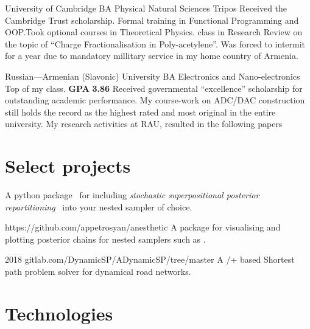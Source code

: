\documentclass{CurriculumVitae}[10pt, condensed]
\begin{document}
{    {University of Cambridge} {BA
     }{Physical Natural Sciences Tripos} {Received the
     Cambridge Trust scholarship. Formal training in Functional
     Programming and OOP.\@ Took optional courses in Theoretical
     Physics.  class in Research Review on the topic of
     ``Charge Fractionalisation in Poly-acetylene''. Was forced to
     intermit for a year due to mandatory millitary service in my home
     country of Armenia. }

    {Russian---Armenian (Slavonic) University}
   {BA }{Electronics and Nano-electronics} {Top of my
     class. \textbf{GPA} \textbf{3.86} Received governmental
     ``excellence'' scholarship for outstanding academic
     performance. My course-work on ADC/DAC construction still holds
     the record as the highest rated and most original in the entire
     university. My research activities at RAU, resulted in
     the following papers~\cite{cu2o,measurement}}

   \section*{Select projects}%
%


 {A
  python package~\cite{sspr-joss} for including \emph{stochastic
    superpositional posterior repartitioning}~\cite{sspr} into your
  nested sampler of choice.}

 {https://github.com/appetrosyan/anesthetic}
{A package for visualising and plotting posterior chains for nested
  samplers such as .}


 {2018}
{gitlab.com/DynamicSP/ADynamicSP/tree/master} {A
  /+ based Shortest path problem solver for
  dynamical road networks. }

}

\section*{Technologies}
\end{document}
